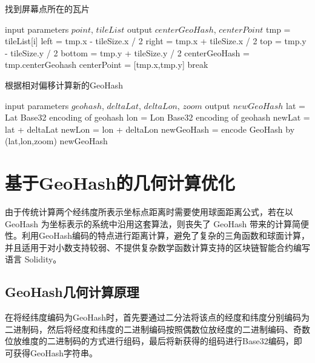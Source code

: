 \begin{algorithm}[h]
  \caption{找到屏幕点所在的瓦片}
  \label{alg:findCenterTile}
  \begin{algorithmic}[1]
  \REQUIRE input parameters $point$, $tileList$
  \ENSURE output $centerGeoHash$, $centerPoint$
    \STATE tmp = tileList[i]
    \STATE left = tmp.x - tileSize.x / 2
    \STATE right = tmp.x + tileSize.x / 2
    \STATE top = tmp.y - tileSize.y / 2
    \STATE bottom = tmp.y + tileSize.y / 2
      \STATE centerGeoHash = tmp.centerGeohash
      \STATE centerPoint = [tmp.x,tmp.y]
      \STATE break
    \ENDIF
  \ENDFOR
  \end{algorithmic}
\end{algorithm}

\begin{algorithm}[h]
  \caption{根据相对偏移计算新的GeoHash}
  \label{alg:newGeoHash}
  \begin{algorithmic}[1]
  \REQUIRE input parameters $geohash$, $deltaLat$, $deltaLon$, $zoom$
  \ENSURE output $newGeoHash$
  \STATE lat = Lat Base32 encoding of geohash
	\STATE lon = Lon Base32 encoding of geohash
	\STATE newLat = lat + deltaLat
	\STATE newLon = lon + deltaLon
	\STATE newGeoHash = encode GeoHash by (lat,lon,zoom)
  \RETURN newGeoHash
  \end{algorithmic}
\end{algorithm}


\section{基于GeoHash的几何计算优化}
由于传统计算两个经纬度所表示坐标点距离时需要使用球面距离公式，若在以 GeoHash 为坐标表示的系统中沿用这套算法，则丧失了 GeoHash 带来的计算简便性。利用GeoHash编码的特点进行距离计算，避免了复杂的三角函数和球面计算，并且适用于对小数支持较弱、不提供复杂数学函数计算支持的区块链智能合约编写语言 Solidity。

\subsection{GeoHash几何计算原理}
在将经纬度编码为GeoHash时，首先要通过二分法将该点的经度和纬度分别编码为二进制码，然后将经度和纬度的二进制编码按照偶数位放经度的二进制编码、奇数位放维度的二进制码的方式进行组码，最后将新获得的组码进行Base32编码，即可获得GeoHash字符串。


